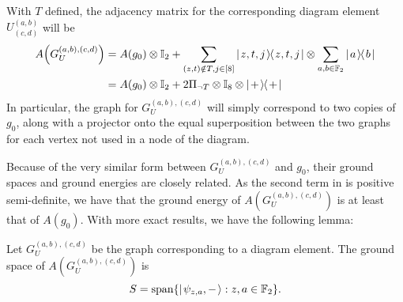 \documentclass[../thesis-main/thesis-main]{subfiles}
\begin{document}
With $T$ defined, the adjacency matrix for the corresponding diagram element $U^{(a,b)}_{(c,d)}$ will be
\begin{align}
  A\Big(G_U^{(a,b),(c,d)}\Big) &= A(g_0) \otimes \mathbb{I}_{2} + \sum_{(z,t)\notin T,j\in[8]} |\mspace{2mu} z,t,j \mspace{2mu} \rangle\mspace{-2mu}\langle\mspace{2mu} z,t,j \mspace{2mu} | \otimes \sum_{a,b\in \mathbb{F}_2} |\mspace{2mu} a \mspace{2mu} \rangle\mspace{-2mu}\langle\mspace{2mu} b \mspace{2mu} | \\
   &= A(g_0)\otimes \mathbb{I}_2 + 2 \Pi_{\lnot T} \otimes \mathbb{I}_{8} \otimes |\mspace{2mu} + \mspace{2mu} \rangle\mspace{-2mu}\langle\mspace{2mu} + \mspace{2mu} |
\label{eq:diagram_element}
\end{align}
In particular, the graph for $G_U^{(a,b),(c,d)}$ will simply correspond to two copies of $g_0$, along with a projector onto the equal superposition between the two graphs for each vertex not used in a node of the diagram.

Because of the very similar form between $G_U^{(a,b),(c,d)}$ and $g_0$, their ground spaces and ground energies are closely related.  As the second term in  is positive semi-definite, we have that the ground energy of $A(G_U^{(a,b),(c,d)})$ is at least that of $A(g_0)$. With more exact results, we have the following lemma:
\begin{lemma}
  Let $G_{U}^{(a,b),(c,d)}$ be the graph corresponding to a diagram element.  The ground space of $A(G_U^{(a,b),(c,d)})$ is
  \begin{equation}
    S = \operatorname{span}\{ |\mspace{2mu} \psi_{z,a},- \mspace{2mu} \rangle : z,a\in \mathbb{F}_2\}.
  \end{equation}
  \label{lem:diagram_element_ground}
\end{lemma}
\end{document}
